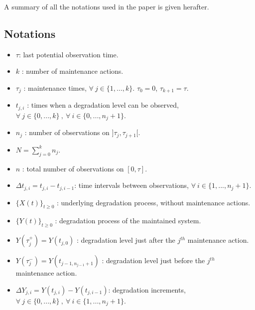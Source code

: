 A summary of all the notations used in the paper is given herafter.


\subsection{Notations} 
\label{appendix:nots}

\begin{itemize}

\item $\tau$: last potential observation time.

\item $k$ : number of maintenance actions.

\item $\tau_j$ : maintenance times, $\forall\ j \in \{1,...,k\}$. $\tau_0=0$, $\tau_{k+1}=\tau$.

\item $t_{j,i}$ : times when a degradation level can be observed, $\forall\ j \in \{0,...,k\}\ ,\ \forall\ i \in \{0,...,n_j+1\}$.

\item $n_j$ : number of observations on $]\tau_j,\tau_{j+1}[$.

\item $N=\sum\limits_{j=0}^k n_j$.

\item $n$ : total number of observations on $[0,\tau]$.

\item $\Delta t_{j,i}=t_{j,i}-t_{j,i-1}$: time intervals between observations, $\forall\ i \in \{1,...,n_j+1\}$.

\item $\{X(t)\}_{t\geq 0}$ :  underlying degradation process, without maintenance actions.

\item $\{Y(t)\}_{t\geq 0}$ :  degradation process of the maintained system.

\item $Y(\tau_j^+)=Y(t_{j,0})$ : degradation level just after the $j^{th}$ maintenance action.

\item $Y(\tau_j^-)=Y(t_{j-1,n_{j-1}+1})$ : degradation level just before the $j^{th}$ maintenance action.

\item $\Delta Y_{j,i}=Y(t_{j,i})-Y(t_{j,i-1})$: degradation increments, $\forall\ j \in \{0,...,k\}\ ,\ \forall\ i \in \{1,...,n_j+1\}$.


\end{itemize}
